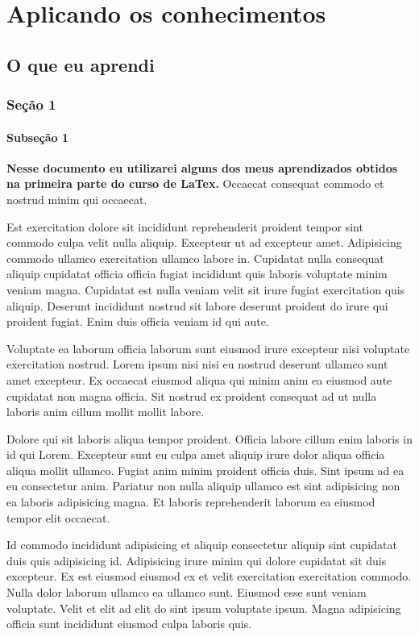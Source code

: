 \documentclass[12pt]{report}
\begin{document}
\part{Aplicando os conhecimentos}

\chapter{O que eu aprendi}

\section{Seção 1}

\subsection{Subseção 1}

\textbf{
    Nesse documento eu utilizarei alguns dos meus aprendizados obtidos na primeira parte do curso de LaTex.
}
Occaecat consequat commodo et nostrud minim qui occaecat.

Est exercitation dolore sit incididunt reprehenderit proident tempor sint commodo culpa velit nulla aliquip. Excepteur ut ad excepteur amet. Adipisicing commodo ullamco exercitation ullamco labore in. Cupidatat nulla consequat aliquip cupidatat officia officia fugiat incididunt quis laboris voluptate minim veniam magna. Cupidatat est nulla veniam velit sit irure fugiat exercitation quis aliquip. Deserunt incididunt nostrud sit labore deserunt proident do irure qui proident fugiat. Enim duis officia veniam id qui aute.

Voluptate ea laborum officia laborum sunt eiusmod irure excepteur nisi voluptate exercitation nostrud. Lorem ipsum nisi nisi eu nostrud deserunt ullamco sunt amet excepteur. Ex occaecat eiusmod aliqua qui minim anim ea eiusmod aute cupidatat non magna officia. Sit nostrud ex proident consequat ad ut nulla laboris anim cillum mollit mollit labore.

Dolore qui sit laboris aliqua tempor proident. Officia labore cillum enim laboris in id qui Lorem. Excepteur sunt eu culpa amet aliquip irure dolor aliqua officia aliqua mollit ullamco. Fugiat anim minim proident officia duis. Sint ipsum ad ea eu consectetur anim. Pariatur non nulla aliquip ullamco est sint adipisicing non ea laboris adipisicing magna. Et laboris reprehenderit laborum ea eiusmod tempor elit occaecat.

Id commodo incididunt adipisicing et aliquip consectetur aliquip sint cupidatat duis quis adipisicing id. Adipisicing irure minim qui dolore cupidatat sit duis excepteur. Ex est eiusmod eiusmod ex et velit exercitation exercitation commodo. Nulla dolor laborum ullamco ea ullamco sunt. Eiusmod esse sunt veniam voluptate. Velit et elit ad elit do sint ipsum voluptate ipsum. Magna adipisicing officia sunt incididunt eiusmod culpa laboris quis.
\end{document}
